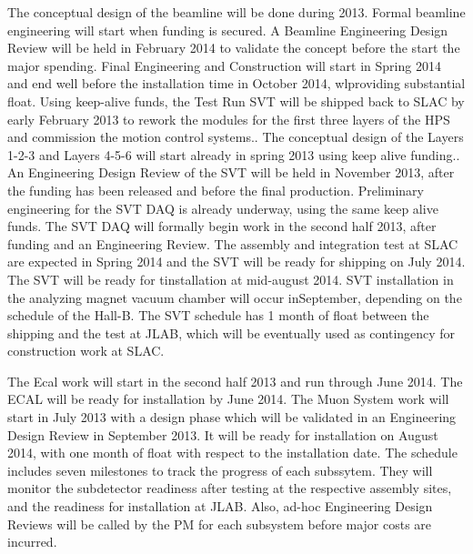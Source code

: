 The conceptual design of the beamline will be done during 2013. Formal beamline engineering will start when funding is secured.  A Beamline Engineering Design Review will be held in February 2014 to validate the concept before the start the major spending. Final Engineering and Construction will start in Spring 2014 and end well before the installation time in October 2014, wlproviding substantial float. Using keep-alive funds, the Test Run SVT will be shipped back to SLAC by early February 2013 to rework the modules for the first three layers of the HPS and commission the motion control systems.. The conceptual design of the Layers 1-2-3 and Layers 4-5-6 will start already in spring 2013 using keep alive funding.. An Engineering Design Review of the SVT will be held in November 2013, after the funding has been released and before the final production. Preliminary engineering for the SVT DAQ is already underway, using the same keep alive funds. The SVT DAQ will formally begin work in  the second half 2013, after funding and an Engineering Review. The assembly and integration test at SLAC are expected in Spring 2014 and the SVT will be ready for shipping on July 2014. The SVT will be ready for tinstallation at mid-august 2014. SVT  installation in the analyzing magnet vacuum chamber will occur inSeptember, depending on the schedule of the Hall-B.  The SVT schedule has 1 month of float between the shipping and the test at JLAB, which will be eventually used as contingency for  construction work at SLAC.

The Ecal work will start in the second half 2013 and run through June 2014. The ECAL will be ready for installation by June 2014. The Muon System work will start in July 2013 with a design phase which will be validated in an Engineering Design Review in September 2013. It will be ready for installation on August 2014, with one month of float with respect to  the installation date.
The schedule includes seven milestones to track the progress of each subssytem. They will monitor the subdetector readiness after testing at the respective assembly sites, and the readiness for installation at JLAB.  Also, ad-hoc Engineering Design Reviews will be called by the PM for each subsystem before major costs are incurred.

